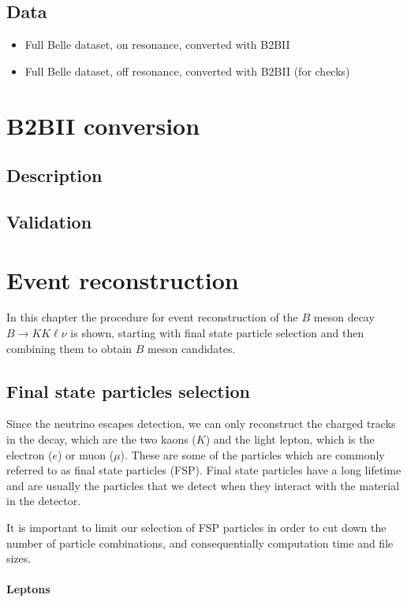 \documentclass[oneside,a4paper,openany,12pt]{scrbook}
\begin{document}
\section{Data}

\begin{itemize}
\item Full Belle dataset, on resonance, converted with B2BII
\item Full Belle dataset, off resonance, converted with B2BII (for checks)
\end{itemize}

\chapter{B2BII conversion}
\section{Description}
\section{Validation}

\chapter{Event reconstruction}

In this chapter the procedure for event reconstruction of the $B$ meson decay $B \to K K \ell \nu$ is shown, starting with final state particle selection and then combining them to obtain $B$ meson candidates. 

\section{Final state particles selection}

Since the neutrino escapes detection, we can only reconstruct the charged tracks in the decay, which are the two kaons ($K$) and the light lepton, which is the electron ($e$) or muon ($\mu$). These are some of the particles which are commonly referred to as final state particles (FSP). Final state particles have a long lifetime and are usually the particles that we detect when they interact with the material in the detector.

It is important to limit our selection of FSP particles in order to cut down the number of particle combinations,  and consequentially computation time and file sizes.

\subsubsection{Leptons}
\end{document}
